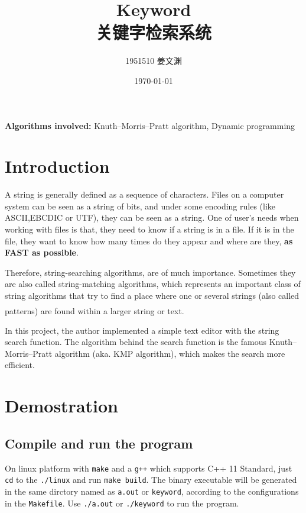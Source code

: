 \documentclass[cn,black,12pt,normal]{elegantnote}
\title{Keyword\\关键字检索系统}
\author{1951510\; 姜文渊}
\institute{\small \url{https://github.com/jwyjohn/Jwy_DataStructureHomework}}
\date{\today}
\newcommand{\uct}[1]{\textsuperscript{\textsuperscript{\cite{#1}}}}
\begin{document}
\maketitle

\textbf{Algorithms involved:} Knuth–Morris–Pratt algorithm, Dynamic programming

\tableofcontents

\section{Introduction}
A string is generally defined as a sequence of characters. Files on a computer system can be seen as a string of bits, and under some encoding rules (like  ASCII,EBCDIC or UTF), they can be seen as a string. One of user's needs when working with files is that, they need to know if a string is in a file. If it is in the file, they want to know how many times do they appear and where are they, \textbf{as FAST as possible}.

Therefore, string-searching algorithms, are of much importance. Sometimes they are also called string-matching algorithms, which represents an important class of string algorithms that try to find a place where one or several strings (also called patterns) are found within a larger string or text.\uct{wiki:String-searching_algorithm}

In this project, the author implemented a simple text editor with the string search function. The algorithm behind the search function is the famous Knuth–Morris–Pratt algorithm (aka. KMP algorithm), which makes the search more efficient.

\section{Demostration}

\subsection{Compile and run the program}

On linux platform with \lstinline{make} and a \lstinline{g++} which supports C++ 11 Standard, just \lstinline{cd} to the \lstinline{./linux} and run \lstinline{make build}. The binary executable will be generated in the same dirctory named as \lstinline{a.out} or \lstinline{keyword}, according to the configurations in the \lstinline{Makefile}. Use \lstinline{./a.out} or \lstinline{./keyword} to run the program.
\end{document}
